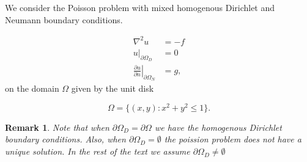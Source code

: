 \documentclass[5pt,a4paper,english]{elsarticle}%
\newcommand{\restr}[2]{\ensuremath{\left.#1\right|_{#2}}}
\newtheorem*{remark}{Remark}
\begin{document}
We consider the Poisson problem with mixed homogenous Dirichlet and Neumann boundary conditions. 

\begin{equation}
\begin{aligned}
    \nabla^2 u &= - f \\
    \restr{u}{\partial \Omega_{D}}  &= 0 \\
    \restr{\frac{\partial u}{\partial n}}{\partial \Omega_{N}} &= g,
\label{poission-problem}
\end{aligned}
\end{equation}
on the domain $\Omega$ given by the unit disk

\begin{equation*}
    \Omega = \{(x,y) : x^2+ y^2 \leq 1 \}.
\end{equation*}
\begin{remark}
Note that when $\partial \Omega_{D} = \partial \Omega$ we have the homogenous Dirichlet boundary conditions. Also, when $\partial \Omega_D = \emptyset$ the poission problem does not have a unique solution. In the rest of the text we assume $\partial \Omega_D \neq \emptyset$ 
\end{remark}
\end{document}
